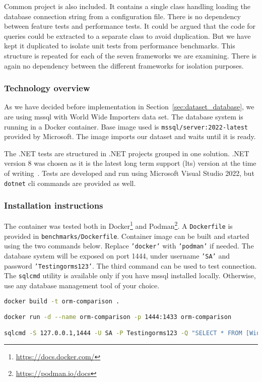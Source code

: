 Common project is also included. It contains a single class handling loading the database connection string from a configuration file. There is no dependency between feature tests and performance tests. It could be argued that the code for queries could be extracted to a separate class to avoid duplication. But we have kept it duplicated to isolate unit tests from performance benchmarks. This structure is repeated for each of the seven frameworks we are examining. There is again no dependency between the different frameworks for isolation purposes.

\subsubsection{Technology overview}
As we have decided before implementation in Section~\autoref{sec:dataset_database}, we are using \acrshort{mssql} with World Wide Importers data set. The database system is running in a Docker container. Base image used is \texttt{mssql/server:2022-latest}~\cite{mssqlDocker} provided by Microsoft. The image imports our dataset and waits until it is ready.

The .NET tests are structured in .NET projects grouped in one solution. .NET version 8 was chosen as it is the latest long term support (\acrshort{lts}) version at the time of writing~\cite{NETversions}. Tests are developed and run using Microsoft Visual Studio 2022, but \texttt{dotnet} \acrshort{cli} commands are provided as well.

\subsubsection{Installation instructions}
The container was tested both in Docker\footnote{\url{https://docs.docker.com/}} and Podman\footnote{\url{https://podman.io/docs}}. A \texttt{Dockerfile} is provided in \texttt{benchmarks/Dockerfile}. Container image can be built and started using the two commands below. Replace \texttt{'docker'} with \texttt{'podman'} if needed. The database system will be exposed on port 1444, under username \texttt{'SA'} and password \texttt{'Testingorms123'}.
The third command can be used to test connection. The \texttt{sqlcmd} utility is available only if you have \acrshort{mssql} installed locally. Otherwise, use any database management tool of your choice.

\begin{lstlisting}[language=sh]
docker build -t orm-comparison .

docker run -d --name orm-comparison -p 1444:1433 orm-comparison

sqlcmd -S 127.0.0.1,1444 -U SA -P Testingorms123 -Q "SELECT * FROM [WideWorldImporters].[Purchasing].[PurchaseOrders]"
\end{lstlisting}

